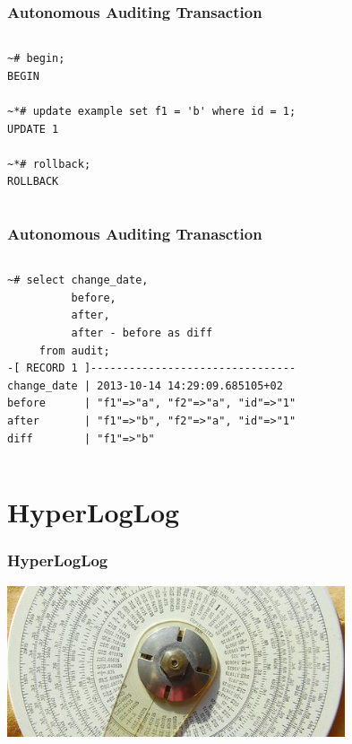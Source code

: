 \documentclass{beamer}
\begin{document}
\begin{frame}[fragile]
  \frametitle{Autonomous Auditing Transaction}

\begin{columns}
\begin{verbatim}
~# begin;
BEGIN

~*# update example set f1 = 'b' where id = 1;
UPDATE 1

~*# rollback;
ROLLBACK
\end{verbatim}  
\end{columns}
\end{frame}

\begin{frame}[fragile]
  \frametitle{Autonomous Auditing Tranasction}

  \vfill

\begin{columns}
\begin{verbatim}
~# select change_date,
          before,
          after,
          after - before as diff
     from audit;
-[ RECORD 1 ]--------------------------------
change_date | 2013-10-14 14:29:09.685105+02
before      | "f1"=>"a", "f2"=>"a", "id"=>"1"
after       | "f1"=>"b", "f2"=>"a", "id"=>"1"
diff        | "f1"=>"b"
\end{verbatim}  
\end{columns}
\end{frame}

\section{HyperLogLog}

\begin{frame}[fragile]
  \frametitle{HyperLogLog}

  \vfill

\begin{center}
  \includegraphics[height=12em]{cardinality1.jpg}
\end{center}
\end{frame}
\end{document}
